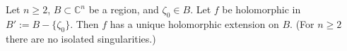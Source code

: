 Let $n \geqslant 2$, $B \subset \mathbb{C}^n$ be a region, and $\zeta_0 \in B$. Let $f$ be holomorphic in $B' := B - \{\zeta_0\}$. Then $f$ has a unique holomorphic extension on $B$. (For $n \geqslant 2$ there are no isolated singularities.)
